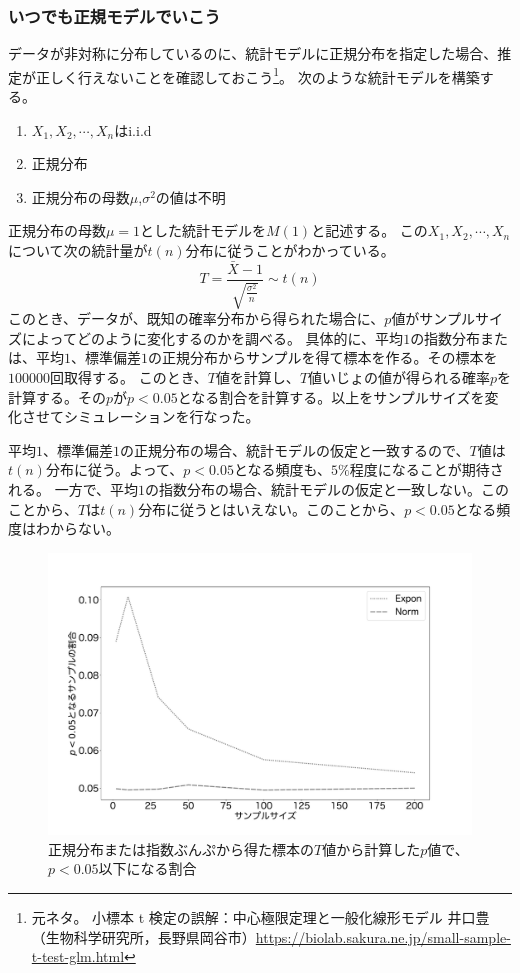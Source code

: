 \subsubsection{いつでも正規モデルでいこう}
データが非対称に分布しているのに、統計モデルに正規分布を指定した場合、推定が正しく行えないことを確認しておこう\footnote{元ネタ。
    小標本 t 検定の誤解：中心極限定理と一般化線形モデル 井口豊（生物科学研究所，長野県岡谷市）\url{https://biolab.sakura.ne.jp/small-sample-t-test-glm.html}}。
次のような統計モデルを構築する。
\begin{enumerate}
    \item $X_1,X_2,\cdots,X_n $はi.i.d
    \item 正規分布
    \item 正規分布の母数$\mu$,$\sigma^2$の値は不明
\end{enumerate}
正規分布の母数$\mu=1$とした統計モデルを$M(1)$と記述する。
この$X_1,X_2,\cdots,X_n$について次の統計量が$t(n)$分布に従うことがわかっている。
\begin{equation*}
    T = \frac{\bar{X}-1}{\sqrt{\frac{\sigma^2}{n}}} \sim t(n)
\end{equation*}
このとき、データが、既知の確率分布から得られた場合に、$p$値がサンプルサイズによってどのように変化するのかを調べる。
具体的に、平均$1$の指数分布または、平均$1$、標準偏差$1$の正規分布からサンプルを得て標本を作る。その標本を$100000$回取得する。
このとき、$T$値を計算し、$T$値いじょの値が得られる確率$p$を計算する。その$p$が$p<0.05$となる割合を計算する。以上をサンプルサイズを変化させてシミュレーションを行なった。

平均$1$、標準偏差$1$の正規分布の場合、統計モデルの仮定と一致するので、$T$値は$t(n)$分布に従う。よって、$p<0.05$となる頻度も、$5\%$程度になることが期待される。
一方で、平均$1$の指数分布の場合、統計モデルの仮定と一致しない。このことから、$T$は$t(n)$分布に従うとはいえない。このことから、$p<0.05$となる頻度はわからない。


\begin{figure}
    \begin{center}
        \includegraphics[width=15cm]{./image/04_/t_test_expon_norm.pdf}
        \caption{正規分布または指数ぶんぷから得た標本の$T$値から計算した$p$値で、$p<0.05$以下になる割合}
    \end{center}
\end{figure}

